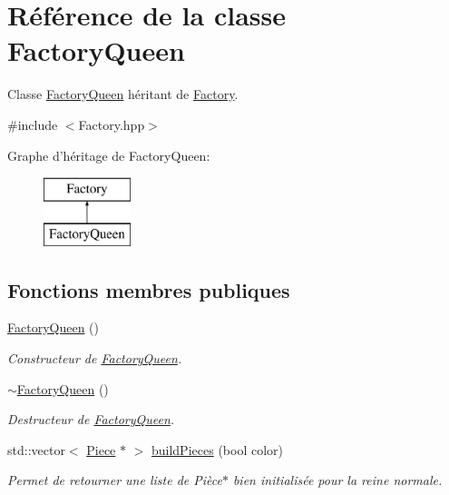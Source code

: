 \hypertarget{class_factory_queen}{\section{Référence de la classe Factory\-Queen}
\label{class_factory_queen}
}


Classe \hyperlink{class_factory_queen}{Factory\-Queen} héritant de \hyperlink{class_factory}{Factory}.  




{\ttfamily \#include $<$Factory.\-hpp$>$}

Graphe d'héritage de Factory\-Queen\-:\begin{figure}[H]
\begin{center}
\leavevmode
\includegraphics[height=2.000000cm]{class_factory_queen}
\end{center}
\end{figure}
\subsection*{Fonctions membres publiques}
\begin{DoxyCompactItemize}
\item 
\hyperlink{class_factory_queen_ab6cc7393c4cb1670ba041a44276a58cd}{Factory\-Queen} ()
\begin{DoxyCompactList}\small\item\em Constructeur de \hyperlink{class_factory_queen}{Factory\-Queen}. \end{DoxyCompactList}\item 
\hyperlink{class_factory_queen_ab1e9dfe91a868c88b775d3220b8f9bc0}{$\sim$\-Factory\-Queen} ()
\begin{DoxyCompactList}\small\item\em Destructeur de \hyperlink{class_factory_queen}{Factory\-Queen}. \end{DoxyCompactList}\item 
std\-::vector$<$ \hyperlink{class_piece}{Piece} $\ast$ $>$ \hyperlink{class_factory_queen_ac256e556b525b35d39f58af62fd1f962}{build\-Pieces} (bool color)
\begin{DoxyCompactList}\small\item\em Permet de retourner une liste de Pièce$\ast$ bien initialisée pour la reine normale. \end{DoxyCompactList}\end{DoxyCompactItemize}


